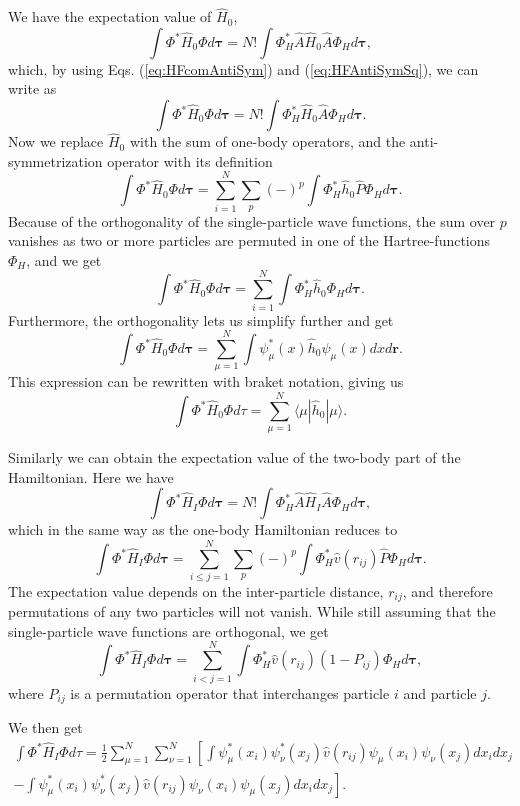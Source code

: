	We have the expectation value of $\hat{H}_0$,
	\[
	\int\Phi^{*}\hat{H}_{0}\Phi d\mathbf{\tau}=N!\int\Phi_{H}^{*}\hat{A}\hat{H}_{0}\hat{A}\Phi_{H}d\mathbf{\tau},
	\]
	which, by using Eqs. (\ref{eq:HFcomAntiSym}) and (\ref{eq:HFAntiSymSq}), we can write as
	\[
	\int\Phi^{*}\hat{H}_{0}\Phi d\mathbf{\tau}=N!\int\Phi_{H}^{*}\hat{H}_{0}\hat{A}\Phi_{H}d\mathbf{\tau}.
	\]
	Now we replace $\hat{H}_0$ with the sum of one-body operators, and the anti-symmetrization operator with its definition 
	\[
	\int\Phi^{*}\hat{H}_{0}\Phi d\mathbf{\tau}=\sum_{i=1}^{N}\sum_{p}(-)^{p}\int\Phi_{H}^{*}\hat{h}_{0}\hat{P}\Phi_{H}d\mathbf{\tau}.
	\]
	Because of the orthogonality of the single-particle wave functions, the sum over $p$ vanishes as two or more particles are permuted in one of the Hartree-functions $\Phi_{H}$, and we get
	\[
	\int\Phi^{*}\hat{H}_{0}\Phi d\mathbf{\tau}=\sum_{i=1}^{N}\int\Phi_{H}^{*}\hat{h}_{0}\Phi_{H}d\mathbf{\tau}.
	\]
	Furthermore, the orthogonality lets us simplify further and get
	\[
	\int\Phi^{*}\hat{H}_{0}\Phi d\mathbf{\tau}=\sum_{\mu=1}^{N}\int\psi_{\mu}^{*}(x)\hat{h}_{0}\psi_{\mu}(x)dxd\mathbf{r}.
	\]
	This expression can be rewritten with braket notation, giving us
	\[
	\int\Phi^{*}\hat{H}_{0}\Phi d\tau=\sum_{\mu=1}^{N}\langle\mu|\hat{h}_{0}|\mu\rangle.
	\]

	Similarly we can obtain the expectation value of the two-body part of the Hamiltonian. Here we have
	\[
	\int\Phi^{*}\hat{H}_{I}\Phi d\mathbf{\tau}=N!\int\Phi_{H}^{*}\hat{A}\hat{H}_{I}\hat{A}\Phi_{H}d\mathbf{\tau},
	\]
	which in the same way as the one-body Hamiltonian reduces to
	\[
	\int\Phi^{*}\hat{H}_{I}\Phi d\mathbf{\tau}=\sum_{i\le j=1}^{N}\sum_{p}(-)^{p}\int\Phi_{H}^{*}\hat{v}(r_{ij})\hat{P}\Phi_{H}d\mathbf{\tau}.
	\]
	The expectation value depends on the inter-particle distance, $r_{ij}$, and therefore permutations of any two particles will not vanish. While still assuming that the single-particle wave functions are orthogonal, we get
	\[
	\int\Phi^{*}\hat{H}_{I}\Phi d\mathbf{\tau}=\sum_{i<j=1}^{N}\int\Phi_{H}^{*}\hat{v}(r_{ij})(1-P_{ij})\Phi_{H}d\mathbf{\tau},
	\]
	where $P_{ij}$ is a permutation operator that interchanges particle $i$ and particle $j$.

	We then get 
	\begin{multline*}
		\int\Phi^{*}\hat{H}_{I}\Phi d\tau=\frac{1}{2}\sum_{\mu=1}^{N}\sum_{\nu=1}^{N}\left[\int\psi_{\mu}^{*}\left(x_{i}\right)\psi_{\nu}^{*}\left(x_{j}\right)\hat{v}\left(r_{ij}\right)\psi_{\mu}\left(x_{i}\right)\psi_{\nu}\left(x_{j}\right)dx_{i}dx_{j}\right. \\ 
		\left.-\int\psi_{\mu}^{*}\left(x_{i}\right)\psi_{\nu}^{*}\left(x_{j}\right)\hat{v}\left(r_{ij}\right)\psi_{\nu}\left(x_{i}\right)\psi_{\mu}\left(x_{j}\right)dx_{i}dx_{j}\right].
	\end{multline*}

